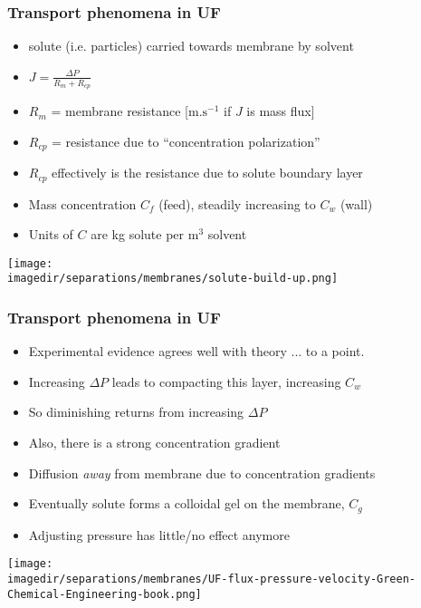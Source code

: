 \begin{frame}\frametitle{Transport phenomena in UF}
	\begin{itemize}		
		\item	solute (i.e. particles) carried towards membrane by solvent
		\item	$J = \displaystyle\frac{\Delta P}{R_m + R_{cp}}$
		\item	$R_m$ = membrane resistance [$\text{m.s}^{-1}$ if $J$ is mass flux] 
		\item	$R_{cp}$ = resistance due to ``concentration polarization''
		\item	$R_{cp}$ effectively is the resistance due to solute boundary layer
		\item	Mass concentration $C_f$ (feed), steadily increasing to $C_w$ (wall)
		\item	Units of $C$ are kg solute per m$^3$ solvent
	\end{itemize}
	\begin{center}
		\texttt{[image: \\imagedir/separations/membranes/solute-build-up.png]}
	\end{center}
\end{frame}

\begin{frame}\frametitle{Transport phenomena in UF}
	\begin{itemize}
		\item	Experimental evidence agrees well with theory ... to a point.
		\item	Increasing $\Delta P$ leads to compacting this layer, increasing $C_w$
		\item	So diminishing returns from increasing $\Delta P$
		\item	Also, there is a strong concentration gradient
		\item	Diffusion \emph{away} from membrane due to concentration gradients		
		\item	Eventually solute forms a colloidal gel on the membrane, $C_g$
		\item	Adjusting pressure has little/no effect anymore
	\end{itemize}
	\begin{center}
		\texttt{[image: \\imagedir/separations/membranes/UF-flux-pressure-velocity-Green-Chemical-Engineering-book.png]}
	\end{center}
	\vspace{-12pt}
\end{frame}

